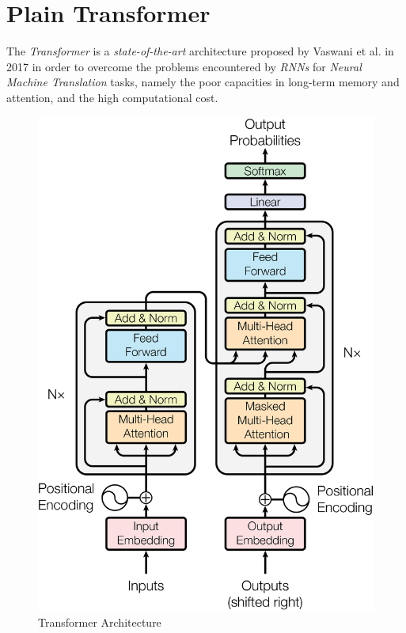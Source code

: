 \section{Plain Transformer}

The \textit{Transformer} \cite{vaswani2017attention} is a \textit{state-of-the-art} architecture proposed by Vaswani et al.
in 2017 in order to overcome the problems encountered by \textit{RNNs} for \textit{Neural Machine Translation} tasks, namely the poor capacities in long-term memory and attention, and the high computational cost.

\begin{figure}[!htb]
    \centering
    \includegraphics[scale=0.75]{images/model-4_5.png}%
    \caption{Transformer Architecture}%
    \label{transformer}
\end{figure}

